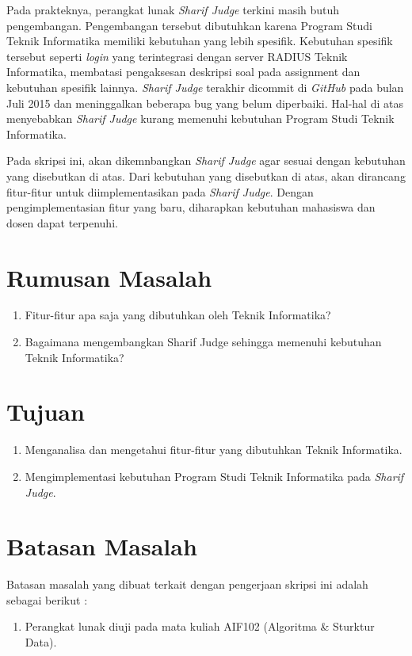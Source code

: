 Pada prakteknya, perangkat lunak \textit{Sharif Judge} terkini masih butuh pengembangan. Pengembangan tersebut dibutuhkan karena Program Studi Teknik Informatika memiliki kebutuhan yang lebih spesifik. Kebutuhan spesifik tersebut seperti \textit{login} yang terintegrasi dengan server RADIUS Teknik Informatika, membatasi pengaksesan deskripsi soal pada assignment dan kebutuhan spesifik lainnya. \textit{Sharif Judge} terakhir dicommit di \textit{GitHub} pada bulan Juli 2015 dan meninggalkan beberapa bug yang belum diperbaiki. Hal-hal di atas menyebabkan \textit{Sharif Judge} kurang memenuhi kebutuhan Program Studi Teknik Informatika. 

Pada skripsi ini, akan dikemnbangkan \textit{Sharif Judge} agar sesuai dengan kebutuhan yang disebutkan di atas. Dari kebutuhan yang disebutkan di atas, akan dirancang fitur-fitur untuk diimplementasikan pada \textit{Sharif Judge}. Dengan pengimplementasian fitur yang baru, diharapkan kebutuhan mahasiswa dan dosen dapat terpenuhi.

\section{Rumusan Masalah}
\label{sec:rumusan}
\begin{enumerate}
	\item Fitur-fitur apa saja yang dibutuhkan oleh Teknik Informatika?
	\item Bagaimana mengembangkan Sharif Judge sehingga memenuhi kebutuhan Teknik Informatika?
\end{enumerate}

\section{Tujuan}
\label{sec:tujuan}
\begin{enumerate}
	\item Menganalisa dan mengetahui fitur-fitur yang dibutuhkan Teknik Informatika.
	\item Mengimplementasi kebutuhan Program Studi Teknik Informatika pada \textit{Sharif Judge}.
\end{enumerate}

\section{Batasan Masalah}
\label{sec:batasan}
Batasan masalah yang dibuat terkait dengan pengerjaan skripsi ini adalah sebagai berikut :
\begin{enumerate}
	\item Perangkat lunak diuji pada mata kuliah AIF102 (Algoritma \& Sturktur Data).
\end{enumerate}

